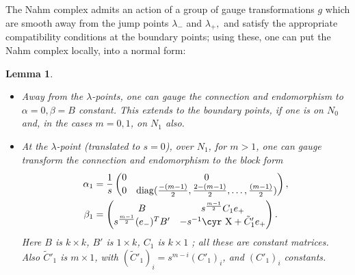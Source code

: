 \documentclass[12pt]{article}
\newtheorem{lemma}[theorem]{Lemma}
\theoremstyle{definition}
\theoremstyle{remark}
\numberwithin{theorem}{section}
\newcommand{\Sh}{\hbox{\cyr X}}
\begin{document}
 The Nahm complex admits an action of a group of gauge transformations $g$ which are smooth away from the jump points $\lambda_-$ and $\lambda_+,$  and satisfy the appropriate compatibility conditions at the boundary points; using these, one can put the Nahm complex locally, into a  normal form:
 
\begin{lemma}\cite[Prop 1.15]{Hurtubise:1989wh}
\label{lemma:normalform}
\begin{itemize}  
\item Away from the $\lambda$-points, one can gauge  the connection and endomorphism to $\alpha = 0, \beta =B$ constant. This extends to the boundary points, if one is
on $N_{ 0}$ and, in the cases $m=0,1$, on $N_1$  also. 
\item At the $\lambda$-point (translated to $s=0$), over $N_1$, for $m>1$, one can gauge transform  the connection and endomorphism to the
block form
\begin{align}\label{alphaForm}
\alpha_{1} &= \frac{1}{s}\begin{pmatrix}0&0\\0&\mathrm{diag}({\frac{-(m-1)}{2}},{\frac{2-(m-1)}{2}},\dots,{\frac{(m-1)}{2}})\end{pmatrix},\\
\label{betaForm}
\beta_{1}&=\begin{pmatrix}B&s^{\frac{m-1}{2}}C_1e_+\\
s^{\frac{m-1}{2}}(e_-)^TB'&-s^{-1}\Sh + \tilde C'_1e_+\end{pmatrix}.
\end{align}
Here $B$ is $k\times k$, $B'$ is $1\times k$, $C_1 $ is $k\times 1$ ; all these are constant matrices. Also 
$ \tilde C'_1$ is $m\times 1$, with $ (\tilde C'_1)_i= s^{m-i}(C'_1)_i$, and $(C'_1)_i$ constants.
\end{itemize}
\end{lemma} 
\end{document}
